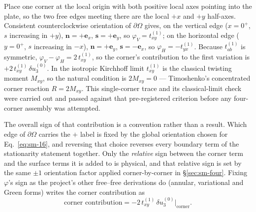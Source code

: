 \documentclass[11pt]{article}
\begin{document}
Place one corner at the local origin with both positive local axes
pointing into the plate, so the two free edges meeting there are the
local $+x$ and $+y$ half-axes. Consistent counterclockwise orientation
of $\partial\Omega$ gives, on the vertical edge ($x=0^+$, $s$ increasing
in $+y$), $\mathbf{n}=+\mathbf{e}_x$, $\mathbf{s}=+\mathbf{e}_y$, so
$\varphi_V=t_{xy}^{(1)}$; on the horizontal edge ($y=0^+$, $s$ increasing
in $-x$), $\mathbf{n}=+\mathbf{e}_y$, $\mathbf{s}=-\mathbf{e}_x$, so
$\varphi_H=-t_{yx}^{(1)}$. Because $t_{ab}^{(1)}$ is symmetric,
$\varphi_V-\varphi_H=2\,t_{xy}^{(1)}$, so the corner's contribution to
the first variation is $+2\,t_{xy}^{(1)}\,\delta u_3^{(0)}$. In the
isotropic Kirchhoff limit $t_{xy}^{(1)}$ is the classical twisting
moment $M_{xy}$, so the natural condition is $2M_{xy}=0$ --- Timoshenko's
concentrated corner reaction $R=2M_{xy}$. This single-corner trace and its
classical-limit check were carried out and passed against that
pre-registered criterion before any four-corner assembly was attempted.

The overall sign of that contribution is a convention rather than a
result. Which edge of $\partial\Omega$ carries the $+$ label is fixed by
the global orientation chosen for Eq.~\eqref{eq:sm-16}, and reversing that
choice reverses every boundary term of the stationarity statement
together. Only the \emph{relative} sign between the corner term and the
surface terms it is added to is physical, and that relative sign is set by
the same $\pm 1$ orientation factor applied corner-by-corner in
\S\ref{sec:sm-four}. Fixing $\varphi$'s sign as the project's other
free--free derivations do (annular, variational and Green forms) writes
the corner contribution as
\begin{equation}
\text{corner contribution} = -2\,t_{xy}^{(1)}\,\delta u_3^{(0)}\Big|_{\mathrm{corner}}.
\label{eq:sm-single}
\end{equation}
\end{document}
